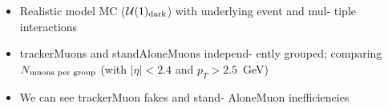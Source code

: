 \documentclass[compress]{beamer}
\begin{document}
\begin{frame}
\begin{columns}
\begin{itemize}
\item Realistic model MC ($\mathcal{U}(1)_{\mbox{\scriptsize dark}}$) with underlying event and mul- tiple interactions

\item trackerMuons and standAloneMuons \mbox{independ-\hspace{-0.5 cm}} ently grouped;
  comparing $N_{\mbox{\scriptsize muons per group}}$ {\scriptsize (with $|\eta| < 2.4$ and $p_T > 2.5$~GeV)}

\item We can see trackerMuon fakes and stand- AloneMuon inefficiencies
\end{itemize}
\end{columns}
\end{frame}
\end{document}
